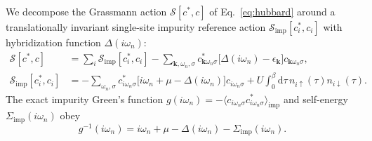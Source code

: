 \documentclass[11pt,a4paper]{article}
\numberwithin{equation}{section}
\theoremstyle{plain}
\theoremstyle{definition}
\providecommand{\vk}{\mathbf{k}}
\providecommand{\dd}{\mathrm{d}}
\begin{document}
We decompose the Grassmann action $\mathcal{S}[c^*,c]$ of Eq.~\eqref{eq:hubbard}
around a translationally invariant single-site impurity reference action
$\mathcal{S}_{\mathrm{imp}}[c^*_i,c_i]$ with hybridization function $\Delta(i\omega_n)$:
\begin{align}
    \mathcal{S}[c^*,c] &= \sum_{i} \mathcal{S}_{\mathrm{imp}}[c^*_i, c_i]
        - \sum_{\vk,\omega_n,\sigma} c^*_{\vk\omega_n\sigma}
          \bigl[ \Delta(i\omega_n) - \epsilon_{\vk} \bigr] c_{\vk\omega_n\sigma},
    \label{eq:S_split} \\
    \mathcal{S}_{\mathrm{imp}}[c^*_i, c_i] &= -\sum_{\omega_n,\sigma}
        c^*_{i\omega_n\sigma} \bigl[ i\omega_n + \mu - \Delta(i\omega_n) \bigr] c_{i\omega_n\sigma}
        + U \int_0^\beta \dd\tau\, n_{i\uparrow}(\tau) n_{i\downarrow}(\tau).
    \label{eq:S_imp}
\end{align}
The exact impurity Green's function
$g(i\omega_n) = -\langle c_{i\omega_n\sigma} c^*_{i\omega_n\sigma} \rangle_{\mathrm{imp}}$
and self-energy $\Sigma_{\mathrm{imp}}(i\omega_n)$ obey
\begin{equation}
    g^{-1}(i\omega_n) = i\omega_n + \mu - \Delta(i\omega_n) - \Sigma_{\mathrm{imp}}(i\omega_n).
    \label{eq:g_imp}
\end{equation}
\end{document}
